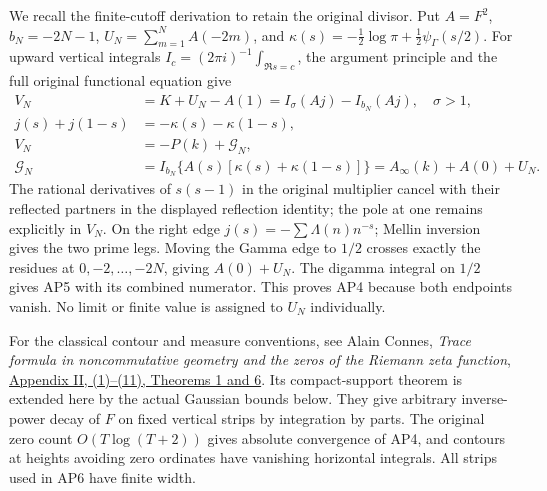 We recall the finite-cutoff derivation to retain the original divisor.
Put \(A=F^2\), \(b_N=-2N-1\),
\(U_N=\sum_{m=1}^N A(-2m)\), and
\(\kappa(s)=-\tfrac12\log\pi+\tfrac12\psi_\Gamma(s/2)\).
For upward vertical integrals \(I_c=(2\pi i)^{-1}\int_{\Re s=c}\),
the argument principle and the full original functional equation give
\[
\begin{split}
 V_N&=K+U_N-A(1)=I_\sigma(Aj)-I_{b_N}(Aj),\quad \sigma>1,\\
 j(s)+j(1-s)&=-\kappa(s)-\kappa(1-s),\\
 V_N&=-P(k)+\mathcal G_N,\\
 \mathcal G_N&=I_{b_N}\{A(s)[\kappa(s)+\kappa(1-s)]\}
             =A_\infty(k)+A(0)+U_N.
\end{split}\tag{AP6}
\]
The rational derivatives of \(s(s-1)\) in the original multiplier
cancel with their reflected partners in the displayed reflection
identity; the pole at one remains explicitly in \(V_N\).
On the right edge \(j(s)=-\sum\Lambda(n)n^{-s}\); Mellin inversion
gives the two prime legs. Moving the Gamma edge to \(1/2\) crosses
exactly the residues at \(0,-2,\ldots,-2N\), giving
\(A(0)+U_N\). The digamma integral on \(1/2\) gives AP5 with
its combined numerator. This proves AP4 because both endpoints vanish.
No limit or finite value is assigned to \(U_N\) individually.

For the classical contour and measure conventions, see Alain Connes,
\emph{Trace formula in noncommutative geometry and the zeros of the
Riemann zeta function},
\href{https://arxiv.org/abs/math/9811068v1}{Appendix II, (1)--(11),
Theorems 1 and 6}. Its compact-support theorem is extended here by
the actual Gaussian bounds below. They give arbitrary inverse-power
decay of \(F\) on fixed vertical strips by integration by parts.
The original zero count \(O(T\log(T+2))\) gives absolute convergence
of AP4, and contours at heights avoiding zero ordinates have vanishing
horizontal integrals. All strips used in AP6 have finite width.

